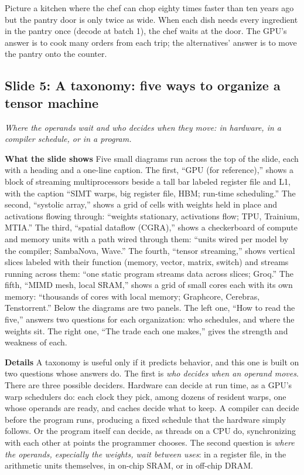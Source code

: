 \documentclass[11pt,letterpaper]{article}
\newcommand{\slide}[3]{%
  \subsection[Slide #1: #2]{Slide #1: #2}%
  {\color{muted}\itshape #3\par}\medskip}
\newcommand{\para}[1]{\medskip\noindent\textbf{#1}\quad}
\newenvironment{intuition}{\begin{tcolorbox}[intuitionbox]}{\end{tcolorbox}}
\begin{document}
\begin{intuition}
Picture a kitchen where the chef can chop eighty times faster than ten years ago but the pantry door is only twice as wide. When each dish needs every ingredient in the pantry once (decode at batch 1), the chef waits at the door. The GPU's answer is to cook many orders from each trip; the alternatives' answer is to move the pantry onto the counter.
\end{intuition}

\slide{5}{A taxonomy: five ways to organize a tensor machine}{Where the operands wait and who decides when they move: in hardware, in a compiler schedule, or in a program.}

\para{What the slide shows} Five small diagrams run across the top of the slide, each with a heading and a one-line caption. The first, ``GPU (for reference),'' shows a block of streaming multiprocessors beside a tall bar labeled register file and L1, with the caption ``SIMT warps, big register file, HBM; run-time scheduling.'' The second, ``systolic array,'' shows a grid of cells with weights held in place and activations flowing through: ``weights stationary, activations flow; TPU, Trainium, MTIA.'' The third, ``spatial dataflow (CGRA),'' shows a checkerboard of compute and memory units with a path wired through them: ``units wired per model by the compiler; SambaNova, Wave.'' The fourth, ``tensor streaming,'' shows vertical slices labeled with their function (memory, vector, matrix, switch) and streams running across them: ``one static program streams data across slices; Groq.'' The fifth, ``MIMD mesh, local SRAM,'' shows a grid of small cores each with its own memory: ``thousands of cores with local memory; Graphcore, Cerebras, Tenstorrent.'' Below the diagrams are two panels. The left one, ``How to read the five,'' answers two questions for each organization: who schedules, and where the weights sit. The right one, ``The trade each one makes,'' gives the strength and weakness of each.

\para{Details} A taxonomy is useful only if it predicts behavior, and this one is built on two questions whose answers do. The first is \emph{who decides when an operand moves}. There are three possible deciders. Hardware can decide at run time, as a GPU's warp schedulers do: each clock they pick, among dozens of resident warps, one whose operands are ready, and caches decide what to keep. A compiler can decide before the program runs, producing a fixed schedule that the hardware simply follows. Or the program itself can decide, as threads on a CPU do, synchronizing with each other at points the programmer chooses. The second question is \emph{where the operands, especially the weights, wait between uses}: in a register file, in the arithmetic units themselves, in on-chip SRAM, or in off-chip DRAM.
\end{document}
